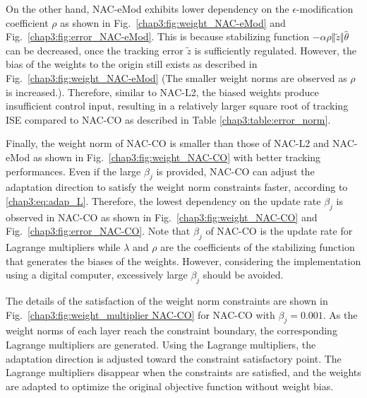 On the other hand, NAC-eMod exhibits lower dependency on the $\epsilon$-modification coefficient $\rho$ as shown in Fig.~\ref{chap3:fig:weight_NAC-eMod} and Fig.~\ref{chap3:fig:error_NAC-eMod}.
This is because stabilizing function $-\alpha\rho\Vert\tilde z\Vert\hat\theta$ can be decreased, once the tracking error $\tilde z$ is sufficiently regulated.
However, the bias of the weights to the origin still exists as described in Fig.~\ref{chap3:fig:weight_NAC-eMod} (\ie The smaller weight norms are observed as $\rho$ is increased.).
Therefore, similar to NAC-L2, the biased weights produce insufficient control input, resulting in a relatively larger square root of tracking ISE compared to NAC-CO as described in Table \ref{chap3:table:error_norm}.

Finally, the weight norm of NAC-CO is smaller than those of NAC-L2 and NAC-eMod as shown in Fig.~\ref{chap3:fig:weight_NAC-CO} with better tracking performances.
Even if the large $\beta_j$ is provided, NAC-CO can adjust the adaptation direction to satisfy the weight norm constraints faster, according to \eqref{chap3:eq:adap_L}.
Therefore, the lowest dependency on the update rate $\beta_j$ is observed in NAC-CO as shown in Fig.~\ref{chap3:fig:weight_NAC-CO} and Fig.~\ref{chap3:fig:error_NAC-CO}.
Note that $\beta_j$ of NAC-CO is the update rate for Lagrange multipliers while $\lambda$ and $\rho$ are the coefficients of the stabilizing function that generates the biases of the weights.
However, considering the implementation using a digital computer, excessively large $\beta_j$ should be avoided.

The details of the satisfaction of the weight norm constraints are shown in Fig.~\ref{chap3:fig:weight_multiplier NAC-CO} for NAC-CO with $\beta_j=0.001$.
As the weight norms of each layer reach the constraint boundary, the corresponding Lagrange multipliers are generated.
Using the Lagrange multipliers, the adaptation direction is adjusted toward the constraint satisfactory point.
The Lagrange multipliers disappear when the constraints are satisfied, and the weights are adapted to optimize the original objective function without weight bias.

